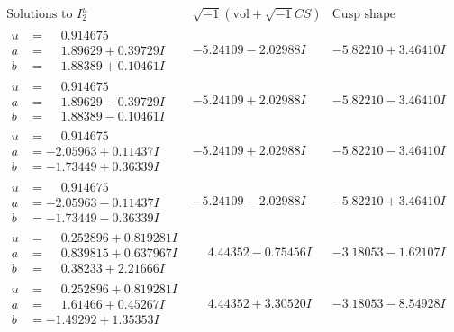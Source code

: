 \documentclass[1p]{elsarticle_modified}
\theoremstyle{definition}
\newcommand{\I}{\sqrt{-1}}
\begin{document}
$$\begin{array}{c|c|c}  
\text{Solutions to }I^u_{2}& \I (\text{vol} + \sqrt{-1}CS) & \text{Cusp shape}\\
 \hline 
\begin{aligned}
u &= \phantom{-}0.914675\phantom{ +0.000000I} \\
a &= \phantom{-}1.89629 + 0.39729 I \\
b &= \phantom{-}1.88389 + 0.10461 I\end{aligned}
 & -5.24109 - 2.02988 I & -5.82210 + 3.46410 I \\ \hline\begin{aligned}
u &= \phantom{-}0.914675\phantom{ +0.000000I} \\
a &= \phantom{-}1.89629 - 0.39729 I \\
b &= \phantom{-}1.88389 - 0.10461 I\end{aligned}
 & -5.24109 + 2.02988 I & -5.82210 - 3.46410 I \\ \hline\begin{aligned}
u &= \phantom{-}0.914675\phantom{ +0.000000I} \\
a &= -2.05963 + 0.11437 I \\
b &= -1.73449 + 0.36339 I\end{aligned}
 & -5.24109 + 2.02988 I & -5.82210 - 3.46410 I \\ \hline\begin{aligned}
u &= \phantom{-}0.914675\phantom{ +0.000000I} \\
a &= -2.05963 - 0.11437 I \\
b &= -1.73449 - 0.36339 I\end{aligned}
 & -5.24109 - 2.02988 I & -5.82210 + 3.46410 I \\ \hline\begin{aligned}
u &= \phantom{-}0.252896 + 0.819281 I \\
a &= \phantom{-}0.839815 + 0.637967 I \\
b &= \phantom{-}0.38233 + 2.21666 I\end{aligned}
 & \phantom{-}4.44352 - 0.75456 I & -3.18053 - 1.62107 I \\ \hline\begin{aligned}
u &= \phantom{-}0.252896 + 0.819281 I \\
a &= \phantom{-}1.61466 + 0.45267 I \\
b &= -1.49292 + 1.35353 I\end{aligned}
 & \phantom{-}4.44352 + 3.30520 I & -3.18053 - 8.54928 I \\ \hline\begin{aligned}

\end{aligned}
\end{array}$$
\end{document}
